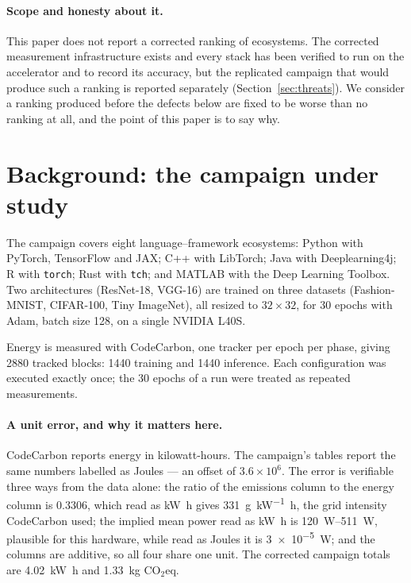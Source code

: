 \documentclass[11pt,a4paper]{article}
\newcommand{\code}[1]{\texttt{\small #1}}
\begin{document}
\paragraph{Scope and honesty about it.}
This paper does not report a corrected ranking of ecosystems. The corrected
measurement infrastructure exists and every stack has been verified to run on the
accelerator and to record its accuracy, but the replicated campaign that would
produce such a ranking is reported separately (Section~\ref{sec:threats}). We
consider a ranking produced before the defects below are fixed to be worse than
no ranking at all, and the point of this paper is to say why.

\section{Background: the campaign under study}
\label{sec:campaign}

The campaign covers eight language--framework ecosystems: Python with PyTorch,
TensorFlow and JAX; C++ with LibTorch; Java with Deeplearning4j; R with
\code{torch}; Rust with \code{tch}; and MATLAB with the Deep Learning Toolbox.
Two architectures (ResNet-18, VGG-16) are trained on three datasets
(Fashion-MNIST, CIFAR-100, Tiny ImageNet), all resized to \(32\times32\), for 30
epochs with Adam, batch size 128, on a single NVIDIA L40S.

Energy is measured with CodeCarbon, one tracker per epoch per phase, giving
\num{2880} tracked blocks: \num{1440} training and \num{1440} inference. Each
configuration was executed exactly once; the 30 epochs of a run were treated as
repeated measurements.

\paragraph{A unit error, and why it matters here.}
CodeCarbon reports energy in kilowatt-hours. The campaign's tables report the
same numbers labelled as Joules --- an offset of \(3.6\times10^{6}\). The error
is verifiable three ways from the data alone: the ratio of the emissions column
to the energy column is \num{0.3306}, which read as \si{\kilo\watt\hour} gives
\SI{331}{\gram\per\kilo\watt\hour}, the grid intensity CodeCarbon used; the
implied mean power read as \si{\kilo\watt\hour} is \SIrange{120}{511}{\watt},
plausible for this hardware, while read as Joules it is
\SI{3e-5}{\watt}; and the columns are additive, so all four share one unit. The
corrected campaign totals are \SI{4.02}{\kilo\watt\hour} and
\SI{1.33}{\kilo\gram} CO$_2$eq.
\end{document}
